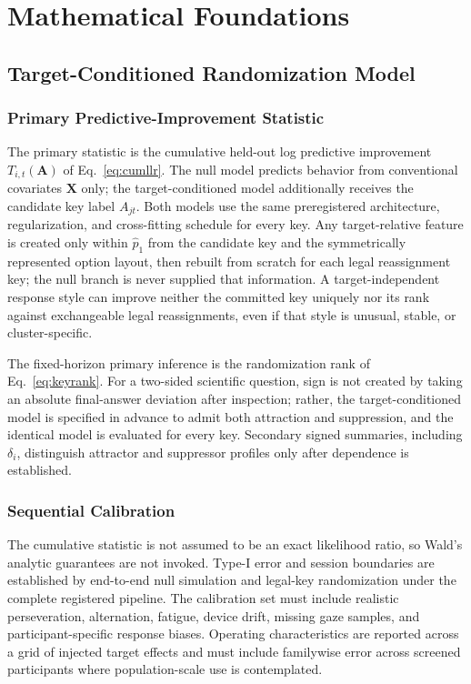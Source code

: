\documentclass[11pt,letterpaper]{article}
\begin{document}
\section{Mathematical Foundations}

\subsection{Target-Conditioned Randomization Model}

\subsubsection{Primary Predictive-Improvement Statistic}
\label{sec:lr}
The primary statistic is the cumulative held-out log predictive improvement $T_{i,t}(\mathbf{A})$ of Eq.~\ref{eq:cumllr}. The null model predicts behavior from conventional covariates $\mathbf{X}$ only; the target-conditioned model additionally receives the candidate key label $A_{jt}$. Both models use the same preregistered architecture, regularization, and cross-fitting schedule for every key. Any target-relative feature is created only within $\hat p_1$ from the candidate key and the symmetrically represented option layout, then rebuilt from scratch for each legal reassignment key; the null branch is never supplied that information. A target-independent response style can improve neither the committed key uniquely nor its rank against exchangeable legal reassignments, even if that style is unusual, stable, or cluster-specific.

The fixed-horizon primary inference is the randomization rank of Eq.~\ref{eq:keyrank}. For a two-sided scientific question, sign is not created by taking an absolute final-answer deviation after inspection; rather, the target-conditioned model is specified in advance to admit both attraction and suppression, and the identical model is evaluated for every key. Secondary signed summaries, including $\delta_i$, distinguish attractor and suppressor profiles only after dependence is established.

\subsubsection{Sequential Calibration}
The cumulative statistic is not assumed to be an exact likelihood ratio, so Wald's analytic guarantees are not invoked. Type-I error and session boundaries are established by end-to-end null simulation and legal-key randomization under the complete registered pipeline. The calibration set must include realistic perseveration, alternation, fatigue, device drift, missing gaze samples, and participant-specific response biases. Operating characteristics are reported across a grid of injected target effects and must include familywise error across screened participants where population-scale use is contemplated.
\end{document}
